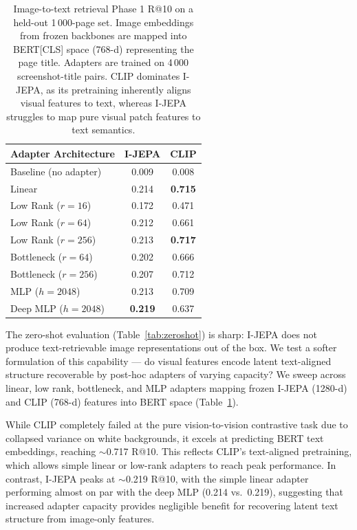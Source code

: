\documentclass{article}
\begin{document}
\begin{table}[t]
\caption{Image-to-text retrieval Phase 1 R@10 on a held-out 1\,000-page set. Image embeddings from frozen backbones are mapped into BERT[CLS] space (768-d) representing the page title. Adapters are trained on 4\,000 screenshot-title pairs. CLIP dominates I-JEPA, as its pretraining inherently aligns visual features to text, whereas I-JEPA struggles to map pure visual patch features to text semantics.}
\label{tab:adapter}
\centering
\small
\begin{tabular}{lcc}
\toprule
Adapter Architecture & I-JEPA & CLIP \\
\midrule
Baseline (no adapter) & 0.009 & 0.008 \\
Linear & 0.214 & \textbf{0.715} \\
Low Rank ($r=16$) & 0.172 & 0.471 \\
Low Rank ($r=64$) & 0.212 & 0.661 \\
Low Rank ($r=256$) & 0.213 & \textbf{0.717} \\
Bottleneck ($r=64$) & 0.202 & 0.666 \\
Bottleneck ($r=256$) & 0.207 & 0.712 \\
MLP ($h=2048$) & 0.213 & 0.709 \\
Deep MLP ($h=2048$) & \textbf{0.219} & 0.637 \\
\bottomrule
\end{tabular}
\end{table}

The zero-shot evaluation (Table~\ref{tab:zeroshot}) is sharp: I-JEPA does not produce text-retrievable image representations out of the box. We test a softer formulation of this capability --- do visual features encode latent text-aligned structure recoverable by post-hoc adapters of varying capacity? We sweep across linear, low rank, bottleneck, and MLP adapters mapping frozen I-JEPA (1280-d) and CLIP (768-d) features into BERT space (Table~\ref{tab:adapter}).

While CLIP completely failed at the pure vision-to-vision contrastive task due to collapsed variance on white backgrounds, it excels at predicting BERT text embeddings, reaching $\sim$0.717 R@10. This reflects CLIP's text-aligned pretraining, which allows simple linear or low-rank adapters to reach peak performance. In contrast, I-JEPA peaks at $\sim$0.219 R@10, with the simple linear adapter performing almost on par with the deep MLP (0.214 vs.\ 0.219), suggesting that increased adapter capacity provides negligible benefit for recovering latent text structure from image-only features.
\end{document}
